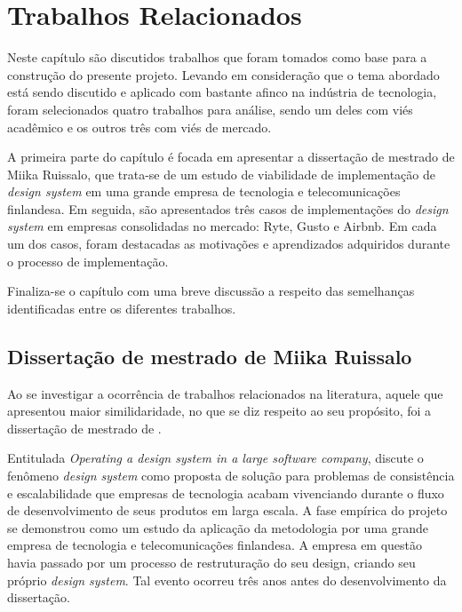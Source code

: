 
\chapter{Trabalhos Relacionados}
\label{chap:trabRelac}

Neste capítulo são discutidos trabalhos que foram tomados como base para a construção do presente projeto. Levando em consideração que o tema abordado está sendo discutido e aplicado com bastante afinco na indústria de tecnologia, foram selecionados quatro trabalhos para análise, sendo um deles com viés acadêmico e os outros três com viés de mercado. 

A primeira parte do capítulo é focada em apresentar a dissertação de mestrado de Miika Ruissalo, que trata-se de um estudo de viabilidade de implementação de \textit{design system} em uma grande empresa de tecnologia e telecomunicações finlandesa. Em seguida, são apresentados três casos de implementações do \textit{design system} em empresas consolidadas no mercado: Ryte, Gusto e Airbnb. Em cada um dos casos, foram destacadas as motivações e aprendizados adquiridos durante o processo de implementação.

Finaliza-se o capítulo com uma breve discussão a respeito das semelhanças identificadas entre os diferentes trabalhos.

\section{Dissertação de mestrado de Miika Ruissalo}
\label{sec:teseMestrado}

Ao se investigar a ocorrência de trabalhos relacionados na literatura, aquele que apresentou maior similidaridade, no que se diz respeito ao seu propósito, foi a dissertação de mestrado de .

Entitulada \textit{Operating a design system in a large software company},  discute o fenômeno \textit{design system} como proposta de solução para problemas de consistência e escalabilidade que empresas de tecnologia acabam vivenciando durante o fluxo de desenvolvimento de seus produtos em larga escala. A fase empírica do projeto se demonstrou como um estudo da aplicação da metodologia por uma grande empresa de tecnologia e telecomunicações finlandesa. A empresa em questão havia passado por um processo de restruturação do seu design, criando seu próprio \textit{design system}. Tal evento ocorreu três anos antes do desenvolvimento da dissertação.

